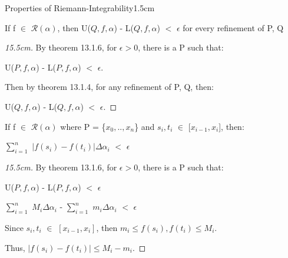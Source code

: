     \vspace{0.5cm}



    \begin{ltheorem}{Properties of Riemann-Integrability}{1.5cm}
        \item If f $\in$ $\mathscr{R}(\alpha)$, then
        U($Q,f,\alpha$) - L($Q,f,\alpha$) $<$ $\epsilon$ for 
        every refinement of P, Q

            \begin{proof}[15.5cm]
                By {\color{red} theorem 13.1.6}, for $\epsilon > 0$, there is a P
                such that:
                
                \hspace{0.5cm}
                U($P,f,\alpha$) - L($P,f,\alpha$) $<$ $\epsilon$.

                Then by {\color{red} theorem 13.1.4},
                for any refinement of P, Q, then:
                
                \hspace{0.5cm}
                U($Q,f,\alpha$) - L($Q,f,\alpha$) $<$ $\epsilon$.
            \end{proof}

        
        \item If f $\in$ $\mathscr{R}(\alpha)$ where
            P = \{$x_0,..,x_n$\} and $s_i,t_i$ $\in$ [$x_{i-1},x_i$],
            then:
        
            \hspace{1cm}
            $\sum_{i=1}^n$ $|f(s_i) - f(t_i)| \Delta \alpha_i$ $<$ $\epsilon$

            \begin{proof}[15.5cm]
                By {\color{red} theorem 13.1.6}, for $\epsilon > 0$,
                there is a P such that:

                \hspace{0.5cm}
                U($P,f,\alpha$) - L($P,f,\alpha$) $<$ $\epsilon$

                \hspace{0.5cm}
                $\sum_{i=1}^n$ $M_i \Delta \alpha_i$
                - $\sum_{i=1}^n$ $m_i \Delta \alpha_i$
                $<$ $\epsilon$

                Since $s_i,t_i$ $\in$ $[x_{i-1},x_i]$, then
                $m_i \leq f(s_i),f(t_i) \leq M_i$.

                Thus, $|f(s_i) - f(t_i)| \leq M_i - m_i$.


\end{proof}
\end{ltheorem}
